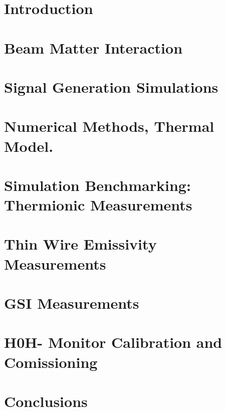 \documentclass[12pt,twoside,openright]{report}
\begin{document}


\pagestyle{plain}




\chapter{Introduction} 
\label{ch:Introduction}


\chapter{Beam Matter Interaction} 
\label{ch:BeamMatterInter}


\chapter{Signal Generation Simulations} 
\label{ch:CurrentModeling}


\chapter{Numerical Methods, Thermal Model.}
\label{ch:TempModeling}


\chapter{Simulation Benchmarking: Thermionic Measurements}
\label{ch:ThermoMeasur}


\chapter{Thin Wire Emissivity Measurements}
\label{ch:EmissivityMeas}


\chapter{GSI Measurements}
\label{ch:GSIMeasurements}


\chapter{H0H- Monitor Calibration and Comissioning}
\label{ch:H0Hm}


\chapter{Conclusions}
\label{conclusions}




\printbibliography 
\end{document}
